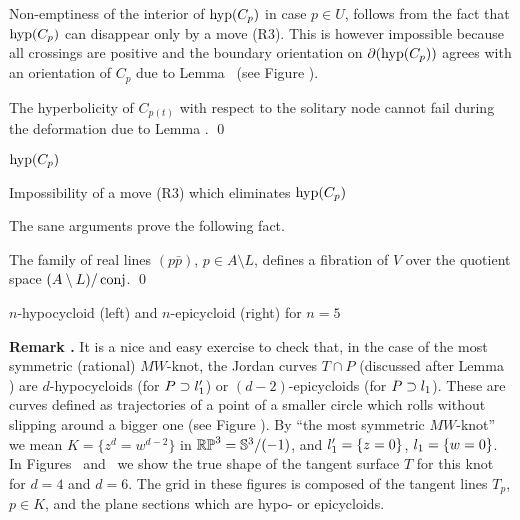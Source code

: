 Non-emptiness of the interior of $\operatorname{hyp}(C_p)$
in case $p\in U$, follows from the fact that $\operatorname{hyp}(C_p)$
can disappear only by a move (R3). This is however impossible because all crossings are positive
and the boundary orientation on $\partial(\operatorname{hyp}(C_p))$ agrees with an orientation of $C_p$
due to Lemma \lemHypC\ (see Figure \figR).

The hyperbolicity of $C_{p(t)}$ with respect to the solitary node cannot fail
during the deformation due to Lemma \lemHypIII.
\qed\enddemo

\midinsert
\centerline{\lower-10mm\hbox{$\operatorname{hyp}(C_p)$}\epsfxsize=20mm}
 Impossibility of a move (R3) which eliminates $\operatorname{hyp}(C_p)$
\endcaption
\endinsert

The sane arguments prove the following fact.

The family of real lines $(p\bar p)$, $p\in A\setminus L$, defines
a fibration of $V$ over the quotient space $(A\setminus L)/\operatorname{conj}$. \qed
\endproclaim






\midinsert
\centerline{\epsfxsize=50mm \hskip 10mm
            \epsfxsize=50mm}
 $n$-hypocycloid (left) and $n$-epicycloid (right) for $n=5$
\endcaption
\endinsert

\smallskip\noindent
{\bf Remark \remCycloid.} It is a nice and easy exercise %
to check that, in the case of the most symmetric (rational) $MW$-knot,
the Jordan curves $T\cap P$ (discussed after Lemma \lemLK)
are $d$-hypocycloids (for $P\supset l'_1$)
or $(d-2)$-epicycloids (for $P\supset l_1$).
These are curves defined as trajectories of a point of a smaller circle which
rolls without slipping around a bigger one (see Figure \figCycloid).
By ``the most symmetric $MW$-knot'' we mean $K=\{z^d=w^{d-2}\}$ in $\Bbb{RP}^3=\Bbb S^3/(-1)$,
and $l'_1=\{z=0\}$, $l_1=\{w=0\}$.
In Figures \figChu\ and \figChuInv\ we show the true shape of the tangent surface $T$ for this knot
for $d=4$ and $d=6$.
The grid in these figures is composed of the tangent lines $T_p$, $p\in K$, and
the plane sections which are hypo- or epicycloids.





